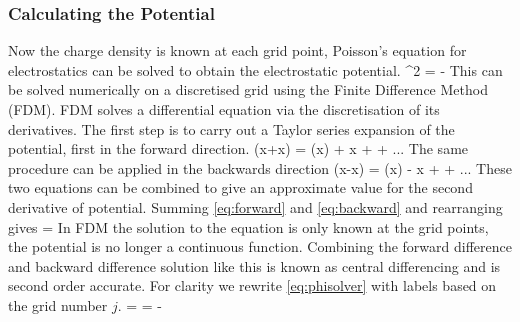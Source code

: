 \subsubsection{Calculating the Potential}
Now the charge density is known at each grid point, Poisson's equation for electrostatics can be solved to obtain the electrostatic potential.
\be
\nabla ^2  = -
\ee
This can be solved numerically on a discretised grid using the Finite Difference Method (FDM). FDM solves a  differential equation via the discretisation of its derivatives. The first step is to carry out a Taylor series expansion of the potential, first in the forward direction.
\be
\psi(x+\Delta x) = \psi(x) + \Delta x  +  + ...
\label{eq:forward}
\ee
The same procedure can be applied in the backwards direction 
\be
\psi(x-\Delta x) = \psi(x) - \Delta x  +  + ...
\label{eq:backward}
\ee
These two equations can be combined to give an approximate value for the second derivative of potential. Summing \eqref{eq:forward} and \eqref{eq:backward} and rearranging gives 
\be 
{} = 
\label{eq:phisolver}
\ee 
In FDM the solution to the equation is only known at the grid points, the potential is no longer a continuous function. Combining the forward difference and backward difference solution like this is known as central differencing and is second order accurate. For clarity we rewrite \eqref{eq:phisolver} with labels based on the grid number $j$. 
\be 
{} =  = -
\label{eq:phisolver1}
\ee 


